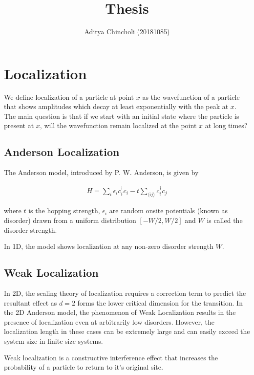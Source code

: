 \documentclass{article}
\title{Thesis}
\author{Aditya Chincholi (20181085)}
\begin{document}
\maketitle




\section{Localization}
We define localization of a particle at point $x$ as the wavefunction of a
particle that shows amplitudes which decay at least exponentially with the peak at $x$. 
The main question is that if we start with an initial state where the
particle is present at $x$, will the wavefunction remain localized at the point $x$
at long times?

\subsection{Anderson Localization}
The Anderson model, introduced by P. W. Anderson, is given by

\begin{align}
    H = \sum_{i} \epsilon_i c_{i}^{\dagger} c_{i} - t\sum_{\langle ij \rangle} c_{i}^{\dagger} c_{j}
\end{align}

where $t$ is the hopping strength, $\epsilon_i$ are random onsite potentials (known as disorder)
drawn from a uniform distribution $[-W/2,W/2]$ and $W$ is called the disorder strength.

In 1D, the model shows localization at any non-zero disorder strength $W$.


\subsection{Weak Localization}
In 2D, the scaling theory of localization requires a correction term to predict the resultant effect
as $d = 2$ forms the lower critical dimension for the transition. In the 2D Anderson model,
the phenomenon of Weak Localization results in the presence of localization even at arbitrarily low
disorders. However, the localization length in these cases can be extremely large and can easily
exceed the system size in finite size systems.

Weak localization is a constructive interference effect that increases the probability of
a particle to return to it's original site. 
\end{document}
